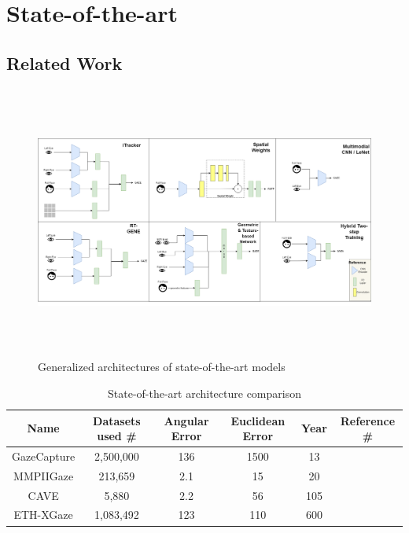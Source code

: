 
\chapter{State-of-the-art}
\label{Chap2}


\section{Related Work}

\begin{figure}
    \centering
    \includegraphics[width=\textwidth,height=9cm]{img/figures/gaze-architectures.png}
    \caption{Generalized architectures of state-of-the-art models}
    \label{architectures_comparison}
 \end{figure}

 \begin{table}[h!]
    \caption{State-of-the-art architecture comparison}
    \centering
    \label{tab:architectures}
    \begin{tabular}{c c c c c c}
    \hline\hline
    Name & Datasets used \# & Angular Error & Euclidean Error & Year & Reference \# \\
    \hline\hline
        GazeCapture & 2,500,000 & 136 & 1500 & 13 \\
        MMPIIGaze & 213,659 & 2.1 & 15 & 20 \\
        CAVE & 5,880 & 2.2 & 56 & 105 \\
        ETH-XGaze & 1,083,492 & 123 & 110 & 600 \\ [1ex]
    \hline
    \end{tabular}
\end{table}

